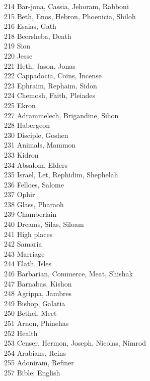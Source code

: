 214 \quad Bar-jona, Cassia, Jehoram, Rabboni\\
215 \quad Beth, Enos, Hebron, Phoenicia, Shiloh\\
216 \quad Esaias, Gath\\
218 \quad Beersheba, Death\\
219 \quad Sion\\
220 \quad Jesse\\
221 \quad Heth, Jason, Jonas\\
222 \quad Cappadocia, Coins, Incense\\
223 \quad Ephraim, Rephaim, Sidon\\
224 \quad Chemosh, Faith, Pleiades\\
225 \quad Ekron\\
227 \quad Adrammelech, Brigandine, Sihon\\
228 \quad Habergeon\\
230 \quad Disciple, Goshen\\
231 \quad Animals, Mammon\\
233 \quad Kidron\\
234 \quad Absalom, Elders\\
235 \quad Israel, Let, Rephidim, Shephelah\\
236 \quad Felloes, Salome\\
237 \quad Ophir\\
238 \quad Glass, Pharaoh\\
239 \quad Chamberlain\\
240 \quad Dreams, Silas, Siloam\\
241 \quad High places\\
242 \quad Samaria\\
243 \quad Marriage\\
244 \quad Elath, Isles\\
246 \quad Barbarian, Commerce, Meat, Shishak\\
247 \quad Barnabas, Kishon\\
248 \quad Agrippa, Jambres\\
249 \quad Bishop, Galatia\\
250 \quad Bethel, Meet\\
251 \quad Arnon, Phinehas\\
252 \quad Health\\
253 \quad Censer, Hermon, Joseph, Nicolas, Nimrod\\
254 \quad Arabians, Reins\\
255 \quad Adoniram, Refiner\\
257 \quad Bible; English\\

